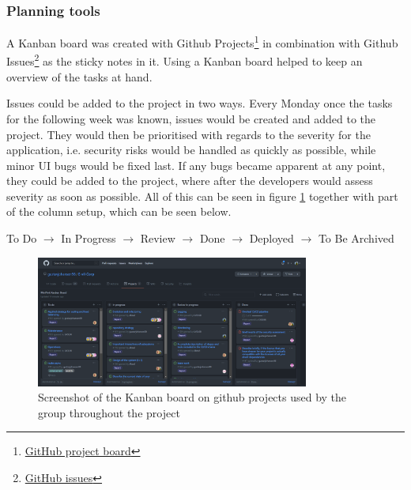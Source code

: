 \documentclass[report/main.tex]{subfiles}
\begin{document}
            \subsubsection{Planning tools}
            \label{subsubsec:planning-tools}
                A Kanban board was created with Github Projects\footnote{\href{https://docs.github.com/en/github/managing-your-work-on-github/managing-project-boards}{GitHub project board}} in combination with Github Issues\footnote{\href{https://docs.github.com/en/github/managing-your-work-on-github/managing-your-work-with-issues-and-pull-requests}{GitHub issues}} as the sticky notes in it. Using a Kanban board helped to keep an overview of the tasks at hand. 
                
                Issues could be added to the project in two ways. Every Monday once the tasks for the following week was known, issues would be created and added to the project. They would then be prioritised with regards to the severity for the application, i.e. security risks would be handled as quickly as possible, while minor UI bugs would be fixed last. If any bugs became apparent at any point, they could be added to the project, where after the developers would assess severity as soon as possible. All of this can be seen in figure \ref{fig:kanban-board-1} together with part of the column setup, which can be seen below.
                
                \begin{center}
                    To Do $\longrightarrow$ In Progress $\longrightarrow$ Review $\longrightarrow$ Done $\longrightarrow$ Deployed $\longrightarrow$ To Be Archived
                \end{center}
                
                \begin{figure}[H]
                    \centering
                    \includegraphics[width=0.8\textwidth]{report/images/Kanban board 1.png}
                    \caption{Screenshot of the Kanban board on github projects used by the group throughout the project}
                    \label{fig:kanban-board-1}
                \end{figure}
\end{document}
